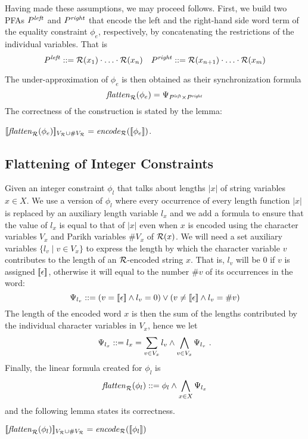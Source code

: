\documentclass[sigplan,screen]{acmart}
\begin{document}
Having made these assumptions, we may proceed follows. First, we build two PFAs $P^{\mathit{left}}$ and $P^{\mathit{right}}$ that encode the left and the right-hand side word term of the equality constraint $\phi_e$, respectively, by concatenating the restrictions of the individual variables. That is
	$$P^{\mathit{left}} ::= \mathcal{R}(x_1)\cdot\ldots \cdot \mathcal{R}(x_n)\ \ \  P^{\mathit{right}} ::= \mathcal{R}(x_{n+1})\cdot\ldots \cdot \mathcal{R}(x_m)$$


The under-approximation of $\phi_e$ is then obtained as their synchronization formula
$$
\mathit{flatten}_{\mathcal{R}}(\phi_e) = \Psi_{P^{\mathit{left}} \times P^{\mathit{right}}}
$$
The correctness of the construction is stated by the lemma:
\begin{lemma}\label{lemma:eqcorrect}
$[\![\mathit{flatten}_{\mathcal{R}}(\phi_e)]\!]_{V_{\mathcal{R}}  \cup \#V_{\mathcal{R}}} = \mathit{encode}_{\mathcal{R}} ([\![\phi_e]\!])$.
\end{lemma}

\subsection{Flattening of Integer Constraints}
{
\newcommand{\lx}{l_x}
\newcommand{\lv}{l_v}
Given an integer constraint $\phi_l$ that talks about lengths $|x|$ of string variables $x\in X$. 
We use a version of $\phi_l$ where every occurrence of every length function $|x|$ is replaced by an auxiliary length variable $\lx$ and we add a formula to ensure that the value of $\lx$ is equal to that of $|x|$ even when $x$ is encoded using the character variables $V_x$ and Parikh variables $\# V_x$ of $\mathcal{R}(x)$.
%
We will need a set auxiliary variables $\{l_v\mid v\in V_x\}$ to express the length by which the character variable $v$ contributes to the length of an $\mathcal{R}$-encoded string $x$. 
That is, $\lv$ will be $0$ if $v$ is assigned $[\![\epsilon]\!]$,
otherwise it will equal to the number $\#v$ of its occurrences in the word:
$$
\Psi_{\lv} \defeq (v = \noepsilon \land l_v=0) \lor (v \neq \noepsilon \land l_v = \# v)
$$
The length of the encoded word $x$ is then the sum of the lengths contributed by the individual character variables in $V_x$, 
hence we let 
$$
\Psi_{\lx} \defeq \lx = \sum_{v\in V_x} l_v \land  \bigwedge_{v\in V_x} \Psi_{\lv}\ .
$$
Finally, the linear formula created for $\phi_l$ is 
$$
\underf \dr {\phi_{l}} \defeq \phi_l \land \bigwedge_{x\in X} \Psi_{\lx}
$$
and the following lemma states its correctness.
}
\begin{lemma}\label{lemma:eqcorrect}
$[\![\mathit{flatten}_{\mathcal{R}}(\phi_l)]\!]_{V_{\mathcal{R}}  \cup \#V_{\mathcal{R}}} = \mathit{encode}_{\mathcal{R}} ([\![\phi_l]\!])$
\end{lemma}
\end{document}
